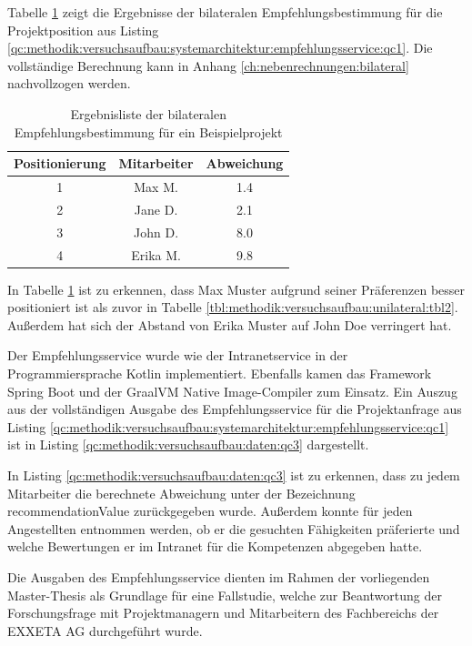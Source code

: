 Tabelle \ref{tbl:methodik:versuchsaufbau:bilateral:tbl2} zeigt die Ergebnisse der bilateralen Empfehlungsbestimmung für die Projektposition aus Listing \ref{qc:methodik:versuchsaufbau:systemarchitektur:empfehlungsservice:qc1}. Die vollständige Berechnung kann in Anhang \ref{ch:nebenrechnungen:bilateral} nachvollzogen werden.

\begin{table}[h]
	\centering
	\begin{tabular}{c|c|c}
		\textbf{Positionierung} & \textbf{Mitarbeiter} & \textbf{Abweichung}\\
		\hline
		1 & Max M.   & 1.4\\
		2 & Jane D.  & 2.1\\
		3 & John D.  & 8.0\\
		4 & Erika M. & 9.8
	\end{tabular}
	\caption{Ergebnisliste der bilateralen Empfehlungsbestimmung für ein Beispielprojekt}
	\label{tbl:methodik:versuchsaufbau:bilateral:tbl2}
\end{table}

\newpage
In Tabelle \ref{tbl:methodik:versuchsaufbau:bilateral:tbl2} ist zu erkennen, dass Max Muster aufgrund seiner Präferenzen besser positioniert ist als zuvor in Tabelle \ref{tbl:methodik:versuchsaufbau:unilateral:tbl2}. Außerdem hat sich der Abstand von Erika Muster auf John Doe verringert hat.

Der Empfehlungsservice wurde wie der Intranetservice in der Programmiersprache Kotlin implementiert. Ebenfalls kamen das Framework Spring Boot und der GraalVM Native Image-Compiler zum Einsatz. Ein Auszug aus der vollständigen Ausgabe des Empfehlungsservice für die Projektanfrage aus Listing \ref{qc:methodik:versuchsaufbau:systemarchitektur:empfehlungsservice:qc1} ist in Listing \ref{qc:methodik:versuchsaufbau:daten:qc3} dargestellt.

In Listing \ref{qc:methodik:versuchsaufbau:daten:qc3} ist zu erkennen, dass zu jedem Mitarbeiter die berechnete Abweichung unter der Bezeichnung recommendationValue zurückgegeben wurde. Außerdem konnte für jeden Angestellten entnommen werden, ob er die gesuchten Fähigkeiten präferierte und welche Bewertungen er im Intranet für die Kompetenzen abgegeben hatte.

Die Ausgaben des Empfehlungsservice dienten im Rahmen der vorliegenden Master-Thesis als Grundlage für eine Fallstudie, welche zur Beantwortung der Forschungsfrage mit Projektmanagern und Mitarbeitern des Fachbereichs \JES der EXXETA AG durchgeführt wurde.

